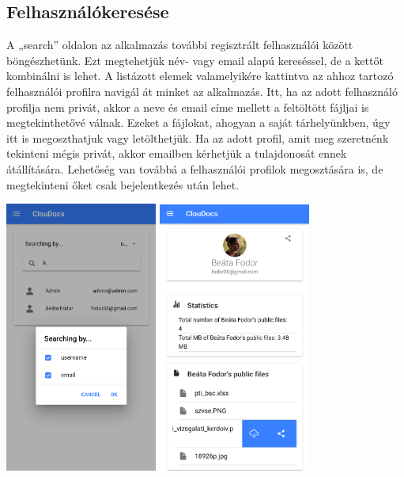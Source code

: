 \documentclass[12pt]{report}
\begin{document}
\subsection{Felhasználókeresése}
A „search” oldalon az alkalmazás további regisztrált felhasználói között böngészhetünk. Ezt megtehetjük név- vagy email alapú kereséssel, de a kettőt kombinálni is lehet. A listázott elemek valamelyikére kattintva az ahhoz tartozó felhasználói profilra navigál át minket az alkalmazás. Itt, ha az adott felhasználó profilja nem privát, akkor a neve és email címe mellett a feltöltött fájljai is megtekinthetővé válnak. Ezeket a fájlokat, ahogyan a saját tárhelyünkben, úgy itt is megoszthatjuk vagy letölthetjük. Ha az adott profil, amit meg szeretnénk tekinteni mégis privát, akkor emailben kérhetjük a tulajdonosát ennek átállítására. Lehetőség van továbbá a felhasználói profilok megosztására is, de megtekinteni őket csak bejelentkezés után lehet.

\begin{center}
	\includegraphics[width=50mm,scale=0.5,]{search.png}
	\includegraphics[width=50mm,scale=0.5,]{profile_public.png}
\end{center}
\end{document}
